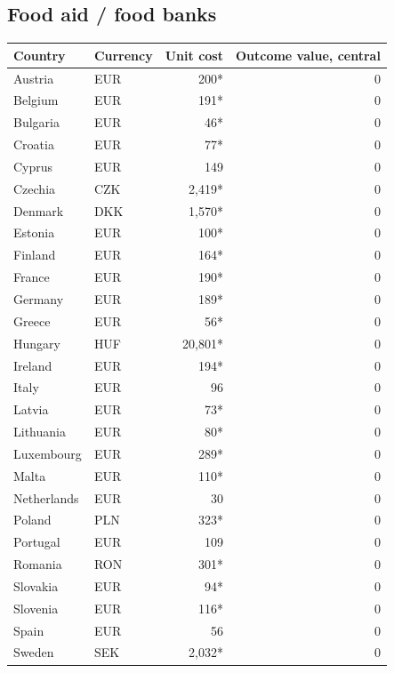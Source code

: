 \subsection*{Food aid / food banks}
\begin{longtable}{llrr}
\toprule
Country & Currency & Unit cost & Outcome value, central \\
\midrule
\endhead
Austria & EUR & 200* & 0 \\
Belgium & EUR & 191* & 0 \\
Bulgaria & EUR & 46* & 0 \\
Croatia & EUR & 77* & 0 \\
Cyprus & EUR & 149 & 0 \\
Czechia & CZK & 2,419* & 0 \\
Denmark & DKK & 1,570* & 0 \\
Estonia & EUR & 100* & 0 \\
Finland & EUR & 164* & 0 \\
France & EUR & 190* & 0 \\
Germany & EUR & 189* & 0 \\
Greece & EUR & 56* & 0 \\
Hungary & HUF & 20,801* & 0 \\
Ireland & EUR & 194* & 0 \\
Italy & EUR & 96 & 0 \\
Latvia & EUR & 73* & 0 \\
Lithuania & EUR & 80* & 0 \\
Luxembourg & EUR & 289* & 0 \\
Malta & EUR & 110* & 0 \\
Netherlands & EUR & 30 & 0 \\
Poland & PLN & 323* & 0 \\
Portugal & EUR & 109 & 0 \\
Romania & RON & 301* & 0 \\
Slovakia & EUR & 94* & 0 \\
Slovenia & EUR & 116* & 0 \\
Spain & EUR & 56 & 0 \\
Sweden & SEK & 2,032* & 0 \\
\bottomrule
\end{longtable}
